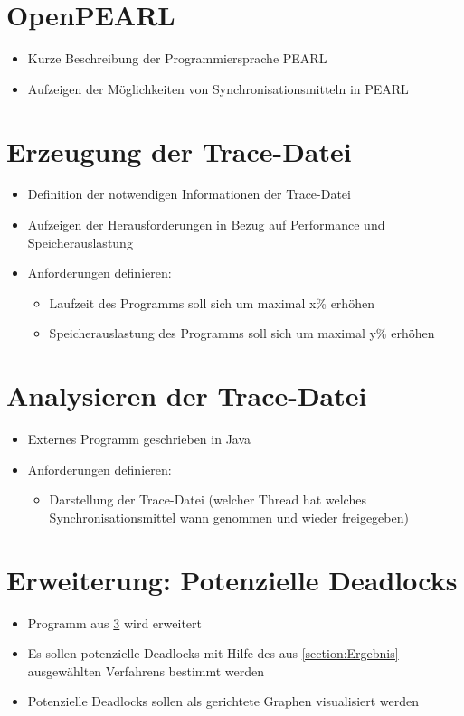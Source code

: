 \section{OpenPEARL}
\begin{itemize}
    \item Kurze Beschreibung der Programmiersprache PEARL
    \item Aufzeigen der Möglichkeiten von Synchronisationsmitteln in PEARL
\end{itemize}

\section{Erzeugung der Trace-Datei}
\begin{itemize}
    \item Definition der notwendigen Informationen der Trace-Datei
    \item Aufzeigen der Herausforderungen in Bezug auf Performance und
    Speicherauslastung
  \item Anforderungen definieren:
  \begin{itemize}
    \item Laufzeit des Programms soll sich um maximal x\% erhöhen
    \item Speicherauslastung des Programms soll sich um maximal y\% erhöhen
  \end{itemize}
\end{itemize}

\section{Analysieren der Trace-Datei}\label{Analysieren der Trace-Datei}
\begin{itemize}
  \item Externes Programm geschrieben in Java
  \item Anforderungen definieren:
  \begin{itemize}
    \item Darstellung der Trace-Datei (welcher Thread hat welches
    Synchronisationsmittel wann genommen und wieder freigegeben) 
  \end{itemize}
\end{itemize}

\section{Erweiterung: Potenzielle Deadlocks}
\begin{itemize}
  \item Programm aus \cref{Analysieren der Trace-Datei} wird erweitert
  \item Es sollen potenzielle Deadlocks mit Hilfe des aus \cref{section:Ergebnis}
  ausgewählten Verfahrens bestimmt werden
  \item Potenzielle Deadlocks sollen als gerichtete Graphen visualisiert werden
\end{itemize}